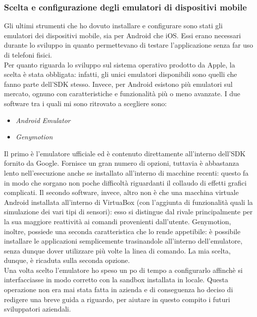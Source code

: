 			\subsubsection{Scelta e configurazione degli emulatori di dispositivi mobile}
				Gli ultimi strumenti che ho dovuto installare e configurare sono stati gli emulatori dei dispositivi mobile, sia per
				Android che iOS. Essi erano necessari durante lo sviluppo in quanto permettevano di testare l'applicazione senza far
				uso di telefoni fisici.\\
				Per quanto riguarda lo sviluppo sul sistema operativo prodotto da Apple, la scelta è stata obbligata: infatti, gli
				unici emulatori disponibili sono quelli che fanno parte dell'SDK stesso. Invece, per Android esistono più
				emulatori sul mercato, ognuno con caratteristiche e funzionalità più o meno avanzate. I due software tra i quali mi
				sono ritrovato a scegliere sono:
				\begin{itemize}
					\item \emph{Android Emulator}
					\item \emph{Genymotion}
				\end{itemize}
				Il primo è l'emulatore ufficiale ed è contenuto direttamente all'interno dell'SDK fornito da Google. Fornisce un
				gran numero di opzioni, tuttavia è abbastanza lento nell'esecuzione anche se installato all'interno di macchine
				recenti: questo fa in modo che sorgano non poche difficoltà riguardanti il collaudo di effetti grafici complicati. Il
				secondo software, invece, altro non è che una macchina virtuale Android installata all'interno di VirtuaBox (con
				l'aggiunta di funzionalità quali la simulazione dei vari tipi di sensori): esso si distingue dal rivale
				principalmente per la sua maggiore reattività ai comandi provenienti dall'utente. Genymotion, inoltre, possiede una
				seconda caratteristica che lo rende appetibile: è possibile installare le applicazioni semplicemente trasinandole
				all'interno dell'emulatore, senza dunque dover utilizzare più volte la linea di comando. La mia scelta, dunque, è
				ricaduta sulla seconda opzione.\\
				Una volta scelto l'emulatore ho speso un po di tempo a configurarlo affinchè si interfacciasse in modo corretto con
				la sandbox installata in locale. Questa operazione non era mai stata fatta in azienda e di conseguenza ho deciso di
				redigere una breve guida a riguardo, per aiutare in questo compito i futuri sviluppatori aziendali.
